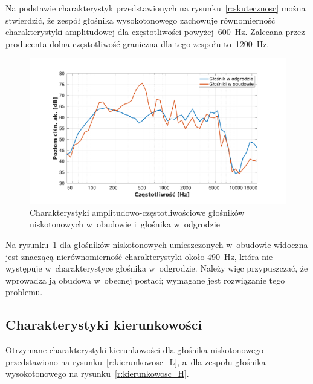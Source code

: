 \documentclass[12pt]{oska}
\begin{document}
    Na podstawie charakterystyk przedstawionych na rysunku~\ref{r:skutecznosc} można stwierdzić, że zespół głośnika wysokotonowego zachowuje równomierność charakterystyki amplitudowej dla częstotliwości powyżej~\SI{600}{\hertz}. Zalecana przez producenta dolna częstotliwość graniczna dla tego zespołu to~\SI{1200}{\hertz}.
    
	\begin{figure}[!ht]
		\centering
		\includegraphics[width=.8\textwidth,trim={2cm .5cm 2cm 1cm},clip]{stolik_obudowa_odgroda.pdf}
		\caption{Charakterystyki amplitudowo-częstotliwościowe głośników niskotonowych w~obudowie i~głośnika w~odgrodzie}
		\label{r:skutecznosc_odgr}
	\end{figure}
	
	Na rysunku~\ref{r:skutecznosc_odgr} dla głośników niskotonowych umieszczonych w~obudowie widoczna jest znaczącą nierównomierność charakterystyki około \SI{490}{\hertz}, która nie występuje w~charakterystyce głośnika w~odgrodzie. Należy więc przypuszczać, że wprowadza ją obudowa w~obecnej postaci; wymagane jest rozwiązanie tego problemu.
	
	\subsection{Charakterystyki kierunkowości} \label{ss:wyniki_kier}
	
	Otrzymane charakterystyki kierunkowości dla głośnika niskotonowego przedstawiono na rysunku~\ref{r:kierunkowosc_L}, a~dla zespołu głośnika wysokotonowego na rysunku~\ref{r:kierunkowosc_H}. 
	
\end{document}
